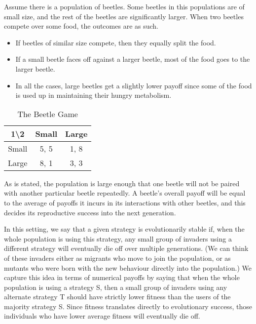\documentclass[11pt]{article}
\theoremstyle{definition}
\begin{document}
Assume there is a population of beetles. Some beetles in this populations are of small size, and the rest of the beetles are significantly larger. When two beetles compete over some food, the outcomes are as such.
\begin{itemize}
\itemsep0em
\item If beetles of similar size compete, then they equally split the food.
\item If a small beetle faces off against a larger beetle, most of the food goes to the larger beetle.
\item In all the cases, large beetles get a slightly lower payoff since some of the food is used up in maintaining their hungry metabolism.
\end{itemize}

\begin{table}[h!]
\centering
\begin{tabular}{|c|c|c|}
\hline
1\textbackslash 2 & Small & Large \\
\hline
Small & 5, 5 & 1, 8 \\
\hline
Large & 8, 1 & 3, 3 \\
\hline
\end{tabular}
\caption{The Beetle Game}
\label{table:tbg}
\end{table}

As is stated, the population is large enough that one beetle will not be paired with another particular beetle repeatedly. A beetle's overall payoff will be equal to the average of payoffs it incurs in its interactions with other beetles, and this decides its reproductive success into the next generation.

In this setting, we say that a given strategy is evolutionarily stable if, when the whole population is using this strategy, any small group of invaders using a different strategy will eventually die off over multiple generations. (We can think of these invaders either as migrants who move to join the population, or as mutants who were born with the new behaviour directly into the population.) We capture this idea in terms of numerical payoffs by saying that when the whole population is using a strategy S, then a small group of invaders using any alternate strategy T should have strictly lower fitness than the users of the majority strategy S. Since fitness translates directly to evolutionary success, those individuals who have lower average fitness will eventually die off. 
\end{document}
